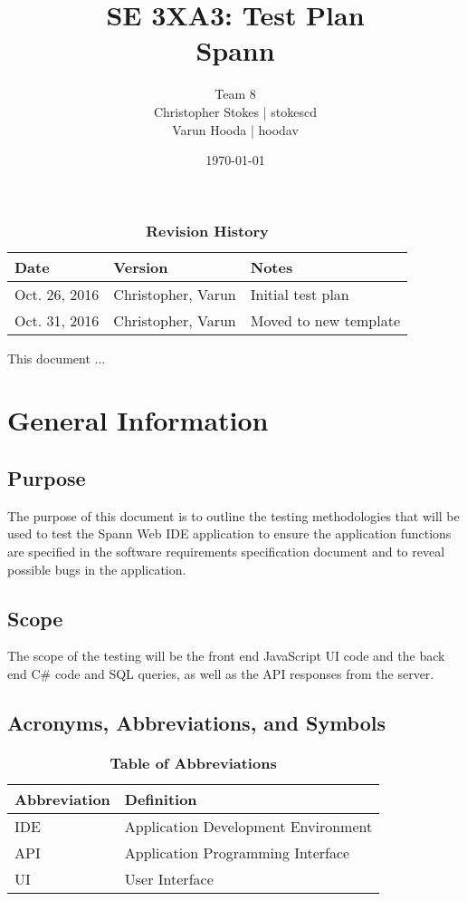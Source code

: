 \documentclass[12pt, titlepage]{article}
\title{SE 3XA3: Test Plan\\Spann}
\author{Team 8
		\\ Christopher Stokes | stokescd
		\\ Varun Hooda | hoodav
}
\date{\today}
\begin{document}
\maketitle

\tableofcontents
\listoftables
\listoffigures

\begin{table}[bp]
\caption{\bf Revision History}
\begin{tabularx}{\textwidth}{p{3cm}p{2cm}X}
\toprule {\bf Date} & {\bf Version} & {\bf Notes}\\
\midrule
    Oct. 26, 2016 & Christopher, Varun & Initial test plan\\
    Oct. 31, 2016 & Christopher, Varun & Moved to new template\\
\bottomrule
\end{tabularx}
\end{table}

\newpage


This document ...

\section{General Information}

\subsection{Purpose}
The purpose of this document is to outline the testing methodologies that will
be used to test the Spann Web IDE application to ensure the application
functions are specified in the software requirements specification document and
to reveal possible bugs in the application.

\subsection{Scope}
The scope of the testing will be the front end JavaScript UI code and the back
end C\# code and SQL queries, as well as the API responses from the server.

\subsection{Acronyms, Abbreviations, and Symbols}
	
\begin{table}[hbp]
\caption{\textbf{Table of Abbreviations}} \label{Table}

\begin{tabularx}{\textwidth}{p{3cm}X}
\toprule
\textbf{Abbreviation} & \textbf{Definition} \\
\midrule
IDE & Application Development Environment\\
API & Application Programming Interface\\
UI & User Interface\\
\bottomrule
\end{tabularx}

\end{table}
\end{document}
